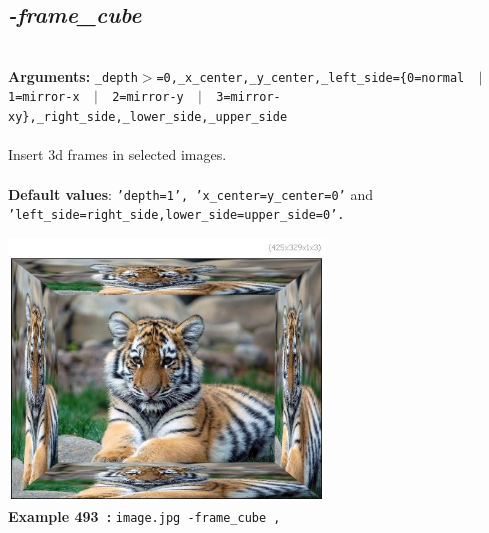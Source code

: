 \documentclass[a4paper,11pt,twoside]{book}
\begin{document}
\subsection{\emph{-frame\_cube} }\vspace*{-0.5em}
~\\\textbf{Arguments: } 
{\small \texttt{\_depth$>$=0,\_x\_center,\_y\_center,\_left\_side=\{0=normal ~$|$~ 1=mirror-x ~$|$~ 2=mirror-y ~$|$~ 3=mirror-xy\},\_right\_side,\_lower\_side,\_upper\_side}}\\~\\
Insert 3d frames in selected images.
~\\~\\\textbf{Default values}: {\small \texttt{'depth=1', 'x\_center=y\_center=0'} and \texttt{'left\_side=right\_side,lower\_side=upper\_side=0'.}}
\begin{center}\includegraphics[keepaspectratio=true,height=7cm,width=\textwidth]{img/gmic_def493.jpg}\\
{\footnotesize \textbf{Example 493~:} \texttt{image.jpg -frame\_cube ,}}
\end{center}
\end{document}
